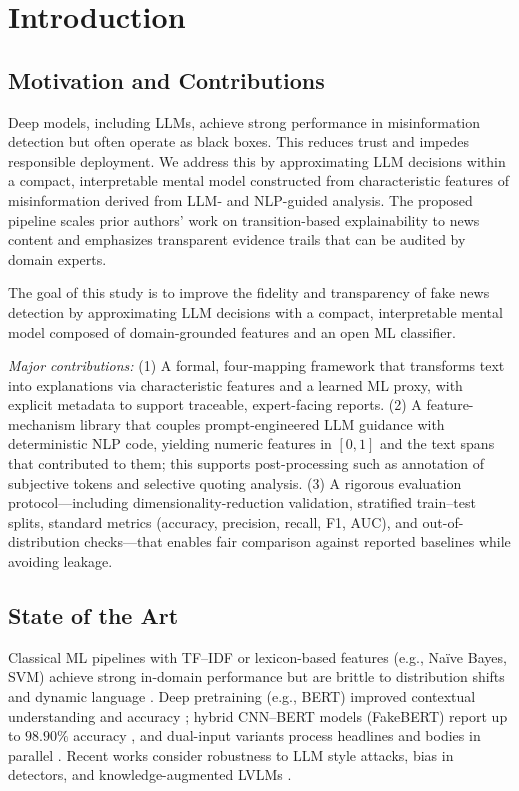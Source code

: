 \documentclass[ai,article,submit,pdftex,moreauthors]{Definitions/mdpi}
\begin{document}
\section{Introduction}

\subsection{Motivation and Contributions}
Deep models, including LLMs, achieve strong performance in misinformation detection but often operate as black boxes. This reduces trust and impedes responsible deployment. We address this by approximating LLM decisions within a compact, interpretable mental model constructed from characteristic features of misinformation derived from LLM- and NLP-guided analysis. The proposed pipeline scales prior authors' work on transition-based explainability to news content and emphasizes transparent evidence trails that can be audited by domain experts.

The goal of this study is to improve the fidelity and transparency of fake news detection by approximating LLM decisions with a compact, interpretable mental model composed of domain-grounded features and an open ML classifier.

\noindent\textit{Major contributions:}
(1) A formal, four-mapping framework that transforms text into explanations via characteristic features and a learned ML proxy, with explicit metadata to support traceable, expert-facing reports.
(2) A feature-mechanism library that couples prompt-engineered LLM guidance with deterministic NLP code, yielding numeric features in $[0,1]$ and the text spans that contributed to them; this supports post-processing such as annotation of subjective tokens and selective quoting analysis.
(3) A rigorous evaluation protocol---including dimensionality-reduction validation, stratified train--test splits, standard metrics (accuracy, precision, recall, F1, AUC), and out-of-distribution checks---that enables fair comparison against reported baselines while avoiding leakage.

\subsection{State of the Art}
Classical ML pipelines with TF--IDF or lexicon-based features (e.g., Na\"{i}ve Bayes, SVM) achieve strong in-domain performance but are brittle to distribution shifts and dynamic language \cite{amer2021context,ahmed2022development}. Deep pretraining (e.g., BERT) improved contextual understanding and accuracy \cite{devlin2018bert,keya2021augfakebert}; hybrid CNN--BERT models (FakeBERT) report up to $98.90\%$ accuracy \cite{kaliyar2021fakebert}, and dual-input variants process headlines and bodies in parallel \cite{farokhian2022parallel}. Recent works consider robustness to LLM style attacks, bias in detectors, and knowledge-augmented LVLMs \cite{wu2023sheep,park2024adstyle,su2023biased,liu2024fkaowl}.
\end{document}
